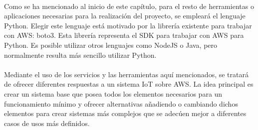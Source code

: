 \documentclass[../../memoria.tex]{subfiles}
\begin{document}
\paragraph{}
Como se ha mencionado al inicio de este capítulo, para el resto de herramientas o aplicaciones necesarias para la realización del proyecto, se empleará el lenguaje Python. Elegir este lenguaje está motivado por la librería existente para trabajar con AWS: boto3. Esta librería representa el SDK para trabajar con AWS para Python. Es posible utilizar otros lenguajes como NodeJS o Java, pero normalmente resulta más sencillo utilizar Python.

\paragraph{}
Mediante el uso de los servicios y las herramientas aquí mencionados, se tratará de ofrecer diferentes respuestas a un sistema IoT sobre AWS. La idea principal es crear un sistema base que posea todos los elementos necesarios para un funcionamiento mínimo y ofrecer alternativas añadiendo o cambiando dichos elementos para crear sistemas más complejos que se adecúen mejor a diferentes casos de usos más definidos.
\end{document}
